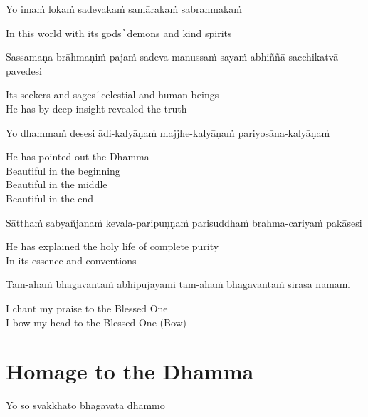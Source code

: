 Yo imaṁ lokaṁ sadevakaṁ samārakaṁ sabrahmakaṁ

\begin{cprenglish}
In this world with its gods ̓ demons and kind spirits
\end{cprenglish}

Sassamaṇa-brāhmaṇiṁ pajaṁ sadeva-manussaṁ sayaṁ abhiññā sacchikatvā pavedesi

\begin{cprenglish}
Its seekers and sages  ̓  celestial and human beings\\
He has by deep insight revealed the truth
\end{cprenglish}

Yo dhammaṁ desesi ādi-kalyāṇaṁ majjhe-kalyāṇaṁ pariyosāna-kalyāṇaṁ

\begin{cprenglish}
He has pointed out the Dhamma\\
Beautiful in the beginning\\
Beautiful in the middle\\
Beautiful in the end\\
\end{cprenglish}

Sātthaṁ sabyañjanaṁ kevala-paripuṇṇaṁ parisuddhaṁ brahma-cariyaṁ pakāsesi

\begin{cprenglish}
He has explained the holy life of complete purity\\
In its essence and conventions
\end{cprenglish}

Tam-ahaṁ bhagavantaṁ abhipūjayāmi tam-ahaṁ bhagavantaṁ sirasā namāmi
\begin{cprenglish}
I chant my praise to the Blessed One\\
I bow my head to the Blessed One (Bow)
\end{cprenglish}

\section*{Homage to the Dhamma}

\begin{leader}
\end{leader}
\begin{leader}
\end{leader}

Yo so svākkhāto bhagavatā dhammo


